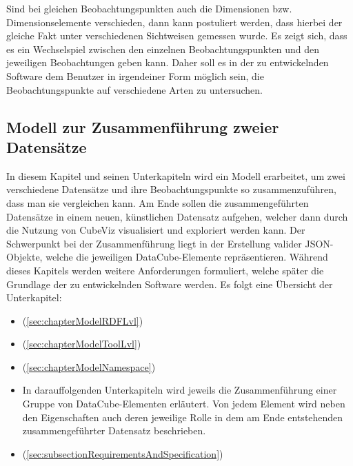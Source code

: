 \documentclass[11pt]{article}
\begin{document}
Sind bei gleichen Beobachtungspunkten auch die Dimensionen bzw. Dimensionselemente verschieden, dann kann postuliert werden, dass hierbei der gleiche Fakt unter verschiedenen Sichtweisen gemessen wurde. Es zeigt sich, dass es ein Wechselspiel zwischen den einzelnen Beobachtungspunkten und den jeweiligen Beobachtungen geben kann. Daher soll es in der zu entwickelnden Software dem Benutzer in irgendeiner Form möglich sein, die Beobachtungspunkte auf verschiedene Arten zu untersuchen.


%
%
\subsection{Modell zur Zusammenführung zweier Datensätze} 
\label{sec:chapterModelMergeDatasets}

In diesem Kapitel und seinen Unterkapiteln wird ein Modell erarbeitet, um zwei verschiedene Datensätze und ihre Beobachtungspunkte so zusammenzuführen, dass man sie vergleichen kann. Am Ende sollen die zusammengeführten Datensätze in einem neuen, künstlichen Datensatz aufgehen, welcher dann durch die Nutzung von CubeViz visualisiert und exploriert werden kann. Der Schwerpunkt bei der Zusammenführung liegt in der Erstellung valider JSON-Objekte, welche die jeweiligen DataCube-Elemente repräsentieren. Während dieses Kapitels werden weitere Anforderungen formuliert, welche später die Grundlage der zu entwickelnden Software werden. Es folgt eine Übersicht der Unterkapitel:

\begin{itemize}

    \item {} (\ref{sec:chapterModelRDFLvl})
    
    \item {} (\ref{sec:chapterModelToolLvl})
    
    \item {} (\ref{sec:chapterModelNamespace})    
    
    \item In darauffolgenden Unterkapiteln wird jeweils die Zusammenführung einer Gruppe von DataCube-Elementen erläutert. Von jedem Element wird neben den Eigenschaften auch deren jeweilige Rolle in dem am Ende entstehenden zusammengeführter Datensatz beschrieben.
    
    \item {} (\ref{sec:subsectionRequirementsAndSpecification})
    
\end{itemize}
\end{document}
